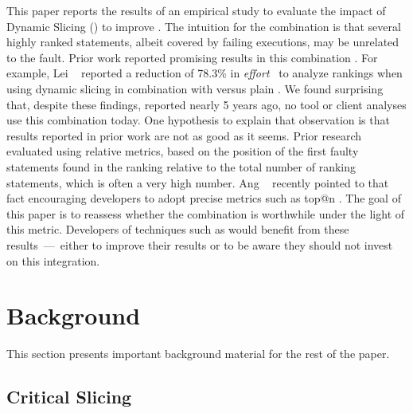 \documentclass[sigplan,10pt,review,anonymous]{acmart}\settopmatter{printfolios=true,printccs=false,printacmref=false}
\begin{document}
This paper reports the results of an empirical study to evaluate the
impact of Dynamic Slicing (\ds{}) to improve \sfl{}. The intuition for
the \comb{} combination is that several highly ranked statements,
albeit covered by failing executions, may be unrelated to the
fault. Prior work reported promising results in this combination
\cite{Wotawa:2010:FLB:1848650.1849235,Alves:2011:FUD:2190078.2190115,DBLP:conf/ecai/HoferW12,lei-mao-dai-wang-2012}.
For example, Lei \etal{}~\cite{lei-mao-dai-wang-2012} reported a
reduction of 78.3\% in \emph{effort}~\cite{7927959} to analyze
rankings when using dynamic slicing in combination with \sfl{} versus
plain \sfl{}. We found surprising that, despite these findings,
reported nearly 5 years ago, no tool or client analyses use this
combination today. One hypothesis to explain that observation is that
results reported in prior work are not as good as it seems. Prior
research evaluated \sfl{} using relative metrics, based on the
position of the first faulty statements found in the ranking relative
to the total number of ranking statements, which is often a very high
number. Ang \etal~\cite{ang-perez-van-deursen-rui-2017} recently
pointed to that fact encouraging developers to adopt precise metrics
such as top@n
\cite{Wu:2014:CLC:2610384.2610386,Lucia:2014:FFL:2642937.2642983,Wen:2016:LLB:2970276.2970359}. The
goal of this paper is to reassess whether the \comb{} combination is
worthwhile under the light of this metric. Developers of techniques
such as \acrAbrev{} would benefit from these results~---~either to
improve their results or to be aware they should not invest on this
integration.



\section{Background}
\label{sec:background}

This section presents important background material for the rest of the paper.

\subsection{Critical Slicing}
\label{sec:slicing}
\end{document}
